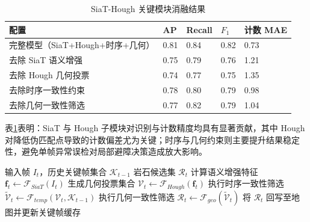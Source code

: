 \begin{table}[H]
	\centering
	\small
	\caption{SiaT-Hough 关键模块消融结果}
	\label{tab:ch5_ablation}
	\begin{tabular}{p{}p{}p{}p{}p{}}
		\toprule
		配置 & AP & Recall & $F_1$ & 计数 MAE \\
		\midrule
		完整模型（SiaT+Hough+时序+几何） & 0.81 & 0.84 & 0.82 & 0.73 \\
		去除 SiaT 语义增强 & 0.75 & 0.79 & 0.76 & 1.21 \\
		去除 Hough 几何投票 & 0.74 & 0.77 & 0.75 & 1.35 \\
		去除时序一致性约束 & 0.78 & 0.80 & 0.79 & 0.98 \\
		去除几何一致性筛选 & 0.77 & 0.82 & 0.79 & 1.04 \\
		\bottomrule
	\end{tabular}
\end{table}

表\ref{tab:ch5_ablation}表明：SiaT 与 Hough 子模块对识别与计数精度均具有显著贡献，其中 Hough 对降低伪匹配点导致的计数偏差尤为关键；时序与几何约束则主要提升结果稳定性，避免单帧异常误检对局部避障决策造成放大影响。

\begin{algorithm}[H]
	\caption{SiaT-Hough 前端融合伪代码}
	\label{alg:ch5_siathough_fusion}
	\begin{algorithmic}[1]
		\REQUIRE 输入帧 $I_t$，历史关键帧集合 $\mathcal{K}_{t-1}$
		\ENSURE 岩石候选集 $\mathcal{R}_t$
		\STATE 计算语义增强特征 $\mathbf{f}_t\leftarrow \mathcal{F}_{SiaT}(I_t)$
		\STATE 生成几何投票集合 $\mathcal{V}_t\leftarrow \mathcal{F}_{Hough}(\mathbf{f}_t)$
		\STATE 执行时序一致性筛选 $\tilde{\mathcal{V}}_t\leftarrow \mathcal{F}_{temp}(\mathcal{V}_t,\mathcal{K}_{t-1})$
		\STATE 执行几何一致性筛选 $\mathcal{R}_t\leftarrow \mathcal{F}_{geo}(\tilde{\mathcal{V}}_t)$
		\STATE 将 $\mathcal{R}_t$ 回写至地图并更新关键帧缓存
	\end{algorithmic}
\end{algorithm}

